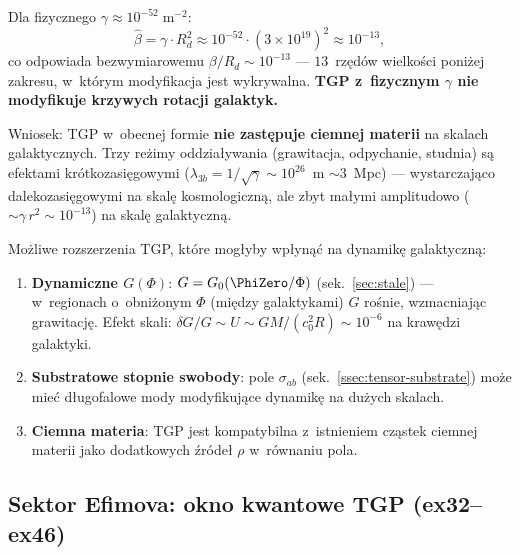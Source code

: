 \begin{remark}%
\label{rem:physical-gamma-rotation}
Dla fizycznego $\gamma \approx 10^{-52}\;\mathrm{m}^{-2}$:
\begin{equation}
  \hat\beta = \gamma \cdot R_d^2
  \approx 10^{-52} \cdot (3 \times 10^{19})^2
  \approx 10^{-13},
\end{equation}
co odpowiada bezwymiarowemu $\beta/R_d \sim 10^{-13}$
--- $13$~rz\k{e}d\'ow wielko\'sci poni\.zej zakresu,
w~kt\'orym modyfikacja jest wykrywalna.
\textbf{TGP z~fizycznym $\gamma$ nie modyfikuje krzywych
rotacji galaktyk.}

Wniosek: TGP w~obecnej formie \textbf{nie zast\k{e}puje
ciemnej materii} na skalach galaktycznych.
Trzy re\.zimy oddzia\l{}ywania (grawitacja, odpychanie,
studnia) s\k{a} efektami kr\'otkozasi\k{e}gowymi
($\lambda_{3b} = 1/\sqrt{\gamma} \sim 10^{26}$~m $\sim 3$~Mpc)
--- wystarczaj\k{a}co dalekozasi\k{e}gowymi na skal\k{e}
kosmologiczn\k{a}, ale zbyt ma\l{}ymi amplitudowo
($\sim\gamma\,r^2 \sim 10^{-13}$) na skal\k{e} galaktyczn\k{a}.
\end{remark}

\begin{remark}%
\label{rem:DM-alternatives}
Mo\.zliwe rozszerzenia TGP, kt\'ore mog\l{}yby wp\l{}yn\k{a}\'c
na dynamik\k{e} galaktyczn\k{a}:
\begin{enumerate}[nosep]
  \item \textbf{Dynamiczne $G(\Phi)$}: $G = G_0(\PhiZero/\Phi)$
    (sek.~\ref{sec:stale}) --- w~regionach o~obni\.zonym $\Phi$
    (mi\k{e}dzy galaktykami) $G$ ro\'snie, wzmacniaj\k{a}c
    grawitacj\k{e}. Efekt skali: $\delta G/G \sim U \sim
    GM/(c_0^2 R) \sim 10^{-6}$ na kraw\k{e}dzi galaktyki.
  \item \textbf{Substratowe stopnie swobody}: pole $\sigma_{ab}$
    (sek.~\ref{ssec:tensor-substrate}) mo\.ze mie\'c d\l{}ugo\-falowe
    mody modyfikuj\k{a}ce dynamik\k{e} na du\.zych skalach.
  \item \textbf{Ciemna materia}: TGP jest kompatybilna
    z~istnieniem cz\k{a}stek ciemnej materii jako dodatkowych
    \'zr\'ode\l{} $\rho$ w~r\'ownaniu pola.
\end{enumerate}
\end{remark}

\subsection{Sektor Efimova: okno kwantowe TGP (ex32--ex46)}%
\label{ssec:efimov-sector}

